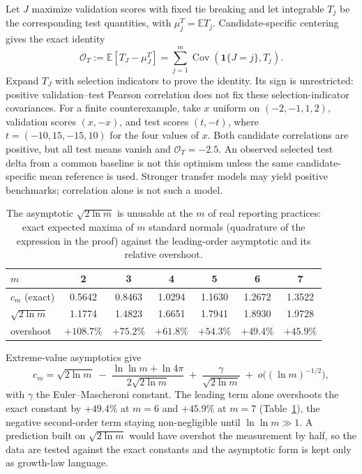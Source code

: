 \begin{remarkx}
Let $J$ maximize validation scores with fixed tie breaking and let integrable
$T_j$ be the corresponding test quantities, with $\mu_j^T=\mathbb ET_j$.
Candidate-specific centering gives the exact identity
\[
\mathcal O_T:=\mathbb E[T_J-\mu_J^T]
=\sum_{j=1}^m\operatorname{Cov}(\mathbf1\{J=j\},T_j).
\]
Expand $T_J$ with selection indicators to prove the identity. Its sign is
unrestricted: positive validation--test Pearson correlation does not fix
these selection-indicator covariances. For a finite counterexample, take
$x$ uniform on $(-2,-1,1,2)$, validation scores $(x,-x)$, and test scores
$(t,-t)$, where $t=(-10,15,-15,10)$ for the four values of $x$. Both candidate correlations
are positive, but all test means vanish and $\mathcal O_T=-2.5$.
An observed selected test delta from a common baseline is not this optimism
unless the same candidate-specific mean reference is used. Stronger transfer
models may yield positive benchmarks; correlation alone is not such a model.
\end{remarkx}
\begin{table}[tbp]
\centering
\small
\begin{tabular}{@{}lcccccc@{}}
\toprule
$m$ & 2 & 3 & 4 & 5 & 6 & 7 \\
\midrule
$c_m$ (exact) & 0.5642 & 0.8463 & 1.0294 & 1.1630 & 1.2672 & 1.3522 \\
$\sqrt{2\ln m}$ & 1.1774 & 1.4823 & 1.6651 & 1.7941 & 1.8930 & 1.9728 \\
overshoot & $+108.7\%$ & $+75.2\%$ & $+61.8\%$ & $+54.3\%$ & $+49.4\%$ &
$+45.9\%$ \\
\bottomrule
\end{tabular}
\caption{The asymptotic $\sqrt{2 \ln m}$ is unusable at the $m$ of real
reporting practices: exact expected maxima of $m$ standard normals
(quadrature of the expression in the proof) against the leading-order
asymptotic and its relative overshoot.}
\label{tab:cm}
\end{table}

\begin{remarkx}
Extreme-value asymptotics give
\[
c_m = \sqrt{2\ln m}
\;-\; \frac{\ln \ln m + \ln 4\pi}{2\sqrt{2\ln m}}
\;+\; \frac{\gamma}{\sqrt{2\ln m}} \;+\; o\bigl((\ln m)^{-1/2}\bigr),
\]
with $\gamma$ the Euler--Mascheroni constant. The leading term alone
overshoots the exact constant by $+49.4\%$ at $m = 6$ and $+45.9\%$ at
$m = 7$ (Table~\ref{tab:cm}), the negative second-order term staying
non-negligible until $\ln \ln m \gg 1$. A prediction built on
$\sqrt{2 \ln m}$ would have overshot the measurement by half, so the data
are tested against the exact constants and the asymptotic form is kept
only as growth-law language.
\end{remarkx}

